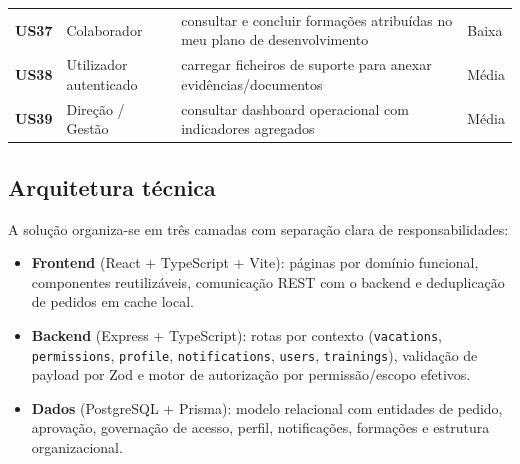 \documentclass[11pt,a4paper,twoside]{article}
\begin{document}
\begin{longtable}{>{\small\centering\arraybackslash\bfseries}p{1.0cm} >{\small}p{3.7cm} >{\small}p{6.8cm} >{\small\centering\arraybackslash}p{1.6cm}}
US37 & Colaborador & consultar e concluir formações atribuídas no meu plano de desenvolvimento & Baixa \\
US38 & Utilizador autenticado & carregar ficheiros de suporte para anexar evidências/documentos & Média \\
US39 & Direção / Gestão & consultar dashboard operacional com indicadores agregados & Média \\
\bottomrule
\end{longtable}

\subsection{Arquitetura técnica}

A solução organiza-se em três camadas com separação clara de responsabilidades:

\begin{itemize}
  \item \textbf{Frontend} (React + TypeScript + Vite): páginas por domínio funcional, componentes reutilizáveis, comunicação REST com o backend e deduplicação de pedidos em cache local.
  \item \textbf{Backend} (Express + TypeScript): rotas por contexto (\texttt{vacations}, \texttt{permissions}, \texttt{profile}, \texttt{notifications}, \texttt{users}, \texttt{trainings}), validação de payload por Zod e motor de autorização por permissão/escopo efetivos.
  \item \textbf{Dados} (PostgreSQL + Prisma): modelo relacional com entidades de pedido, aprovação, governação de acesso, perfil, notificações, formações e estrutura organizacional.
\end{itemize}
\end{document}
